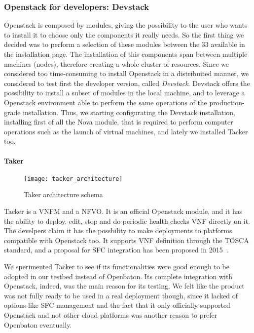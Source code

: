 \subsubsection{Openstack for developers: Devstack}
Openstack is composed by modules, giving the possibility to the user who wants 
to install it to choose only the components it really needs. So the first thing 
we decided was to perform a selection of these modules between the 33 available 
in the installation page. The installation of this components span between 
multiple machines (nodes), therefore creating a whole cluster of resources. 
Since we considered too time-consuming to install Openstack in a distribuited 
manner, we considered to test first the developer version, called 
\emph{Devstack}. Devstack offers the possibility to install a subset of modules 
in the local machine, and to leverage a Openstack environment able to perform 
the same operations of the production-grade installation. Thus, we starting 
configurating the Devstack installation, installing first of all the Nova 
module, that is required to perform computer operations such as the launch of 
virtual machines, and lately we installed Tacker too.

\paragraph*{Taker}
\begin{figure}[h]
  \centering
  \texttt{[image: tacker\_architecture]}
  \caption[Taker architecture schema]{Taker architecture
    schema~\cite{tackerOpenstackwiki}}
\end{figure}
Tacker is a VNFM and a NFVO. It is an official Openstack module, and it has the
ability to deploy, edit, stop and do periodic health checks VNF directly on it.
The develpers claim it has the possbility to make deployments to platforms
compatible with Openstack too. It supports VNF definition through the TOSCA
standard, and a proposal for SFC integration has been proposed in
2015~\cite{tackerOpenstackwiki}.

We sperimented Tacker to see if its functionalities were good enough to be
adopted in our testbed instead of Openbaton. Its complete integration with
Openstack, indeed, was the main reason for its testing. We felt like the product
was not fully ready to be used in a real deployment though, since it lacked of
options like SFC management and the fact that it only officially supported
Openstack and not other cloud platforms was another reason to prefer Openbaton
eventually.

